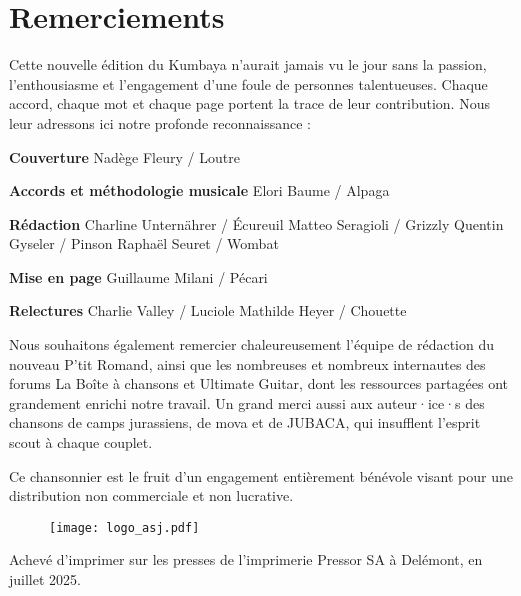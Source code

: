 \section*{Remerciements}
Cette nouvelle édition du Kumbaya n'aurait jamais vu le jour sans la passion, l'enthousiasme et l'engagement d'une foule de personnes talentueuses. Chaque accord, chaque mot et chaque page portent la trace de leur contribution. Nous leur adressons ici notre profonde reconnaissance :

\begin{flushleft}
    \textbf{Couverture} \linebreak
    Nadège Fleury / Loutre

    \textbf{Accords et méthodologie musicale} \linebreak
    Elori Baume / Alpaga

    \textbf{Rédaction} \linebreak
    Charline Unternährer / Écureuil \linebreak
    Matteo Seragioli / Grizzly \linebreak
    Quentin Gyseler / Pinson \linebreak
    Raphaël Seuret / Wombat

    \textbf{Mise en page} \linebreak
    Guillaume Milani / Pécari

    \textbf{Relectures} \linebreak
    Charlie Valley / Luciole\linebreak
    Mathilde Heyer / Chouette
\end{flushleft}

Nous souhaitons également remercier chaleureusement l'équipe de rédaction du nouveau P'tit Romand, ainsi que les nombreuses et nombreux internautes des forums La Boîte à chansons et Ultimate Guitar, dont les ressources partagées ont grandement enrichi notre travail. Un grand merci aussi aux auteur·ice·s des chansons de camps jurassiens, de mova et de JUBACA, qui insufflent l'esprit scout à chaque couplet.

Ce chansonnier est le fruit d'un engagement entièrement bénévole visant pour une distribution non commerciale et non lucrative.

\begin{figure}[h]
    \vspace{4pt}
    \texttt{[image: logo\_asj.pdf]}
    \centering
    \vspace{4pt}
\end{figure}

Achevé d'imprimer sur les presses de l'imprimerie Pressor SA à Delémont, en juillet 2025.
